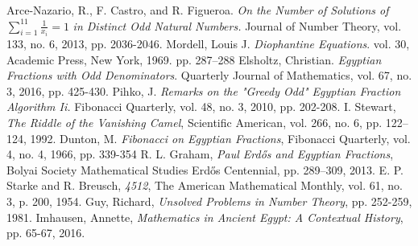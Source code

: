 \documentclass[paper=a4, fontsize=11pt]{scrartcl}
\numberwithin{equation}{section}	 %
\numberwithin{figure}{section}	 %
\numberwithin{table}{section}	 %
\begin{document}
\begin{thebibliography}{9}
	Arce-Nazario, R., F. Castro, and R. Figueroa.
	\textit{On the Number of Solutions of} \:\:$\sum_{i=1}^{11} \frac{1}{x_i} = 1$ \textit{in Distinct Odd Natural Numbers.}
	Journal of Number Theory, vol. 133, no. 6, 2013, pp. 2036-2046.
	Mordell, Louis J.
	\textit{Diophantine Equations}.
	vol. 30, Academic Press, New York, 1969. pp. 287–288
	Elsholtz, Christian.
	\textit{Egyptian Fractions with Odd Denominators}.
	Quarterly Journal of Mathematics, vol. 67, no. 3, 2016, pp. 425-430.
	Pihko, J.
	\textit{Remarks on the "Greedy Odd" Egyptian Fraction Algorithm Ii.}
	Fibonacci Quarterly, vol. 48, no. 3, 2010, pp. 202-208.
	I. Stewart,
	\textit{The Riddle of the Vanishing Camel},
	Scientific American, vol. 266, no. 6, pp. 122–124, 1992.
	Dunton, M.
	\textit{Fibonacci on Egyptian Fractions},
	Fibonacci Quarterly, vol. 4, no. 4, 1966, pp. 339-354
	R. L. Graham,
	\textit{Paul Erd\H{o}s and Egyptian Fractions},
	Bolyai Society Mathematical Studies Erd\H{o}s Centennial, pp. 289–309, 2013.
	E. P. Starke and R. Breusch,
	\textit{4512},
	The American Mathematical Monthly, vol. 61, no. 3, p. 200, 1954.
	Guy, Richard,
	\textit{Unsolved Problems in Number Theory},
	pp. 252-259,
	1981.
	Imhausen, Annette,
	\textit{Mathematics in Ancient Egypt: A Contextual History},
	pp. 65-67,
	2016.
	
\end{thebibliography}

%
%

\end{document}
